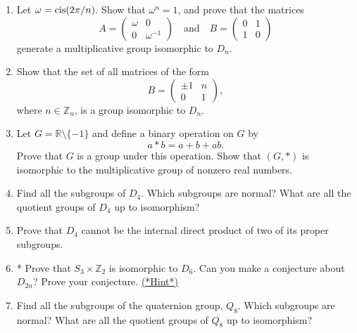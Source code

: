 {\small
\begin{enumerate}[(1)]
 
 
\item
Let $\omega = \operatorname{cis}(2 \pi /n)$.  Show that $\omega^n = 1$, and  prove that the matrices 
\[
A=
\begin{pmatrix}
\omega & 0 \\
0 & \omega^{-1}
\end{pmatrix}
\quad \text{and} \quad
B =
\begin{pmatrix}
0 & 1 \\
1 & 0
\end{pmatrix}
\]
generate a multiplicative group isomorphic to $D_n$.
 

\item
Show that the set of all matrices of the form
\[
B =
\begin{pmatrix}
\pm 1 & n \\
0 & 1
\end{pmatrix},
\]
where $n \in {\mathbb Z}_n$, is a group isomorphic to $D_n$. 


\item
Let $G = {\mathbb R} \setminus \{ -1 \}$ and define a binary operation on
$G$ by 
\[
a \ast b = a + b + ab.
\]
Prove that $G$ is a group under this operation. Show that $(G, *)$ is
isomorphic to the multiplicative group of nonzero real numbers.
  
\item
Find all the subgroups of $D_4$. Which subgroups are normal? What are
all the quotient groups of $D_4$ up to isomorphism?


\item
Prove that $D_4$ cannot be the internal direct product of two of its
proper subgroups. 
 

\item \label{exercise:isomorph:eoc}
* Prove that $S_3 \times {\mathbb Z}_2$ is isomorphic to $D_6$. Can you
make a conjecture about $D_{2n}$? Prove your conjecture. 
\hyperref[sec:isomorph:hints]{(*Hint*)}
 


\item
Find all the subgroups of the quaternion group, $Q_8$. Which subgroups
are normal? What are all the quotient groups of $Q_8$ up to isomorphism?


 


\end{enumerate}}

